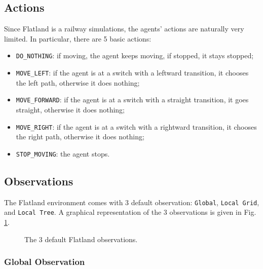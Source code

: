 \documentclass[a4paper, 12pt]{article}
\numberwithin{equation}{section}
\begin{document}
\subsection[Actions]{Actions \cite{actions-rewards}}

Since Flatland is a railway simulations, the agents' actions are naturally very limited. In particular, there are 5 basic actions:
\begin{itemize}
	\item \texttt{DO\_NOTHING}: if moving, the agent keeps moving, if stopped, it stays stopped;
	\item \texttt{MOVE\_LEFT}: if the agent is at a switch with a leftward transition, it chooses the left path, otherwise it does nothing;
	\item \texttt{MOVE\_FORWARD}: if the agent is at a switch with a straight transition, it goes straight, otherwise it does nothing;
	\item \texttt{MOVE\_RIGHT}: if the agent is at a switch with a rightward transition, it chooses the right path, otherwise it does nothing;
	\item \texttt{STOP\_MOVING}: the agent stops.
\end{itemize}


\subsection[Observations]{Observations \cite{observations}}

The Flatland environment comes with 3 default observation: \texttt{Global}, \texttt{Local Grid}, and \texttt{Local Tree}. A graphical representation of the 3 observations is given in Fig. \ref{fig:observations}.

\begin{figure}[h]
	\centering
		\caption{The 3 default Flatland observations.}
	\label{fig:observations}
\end{figure}


\subsubsection{Global Observation}
\end{document}
